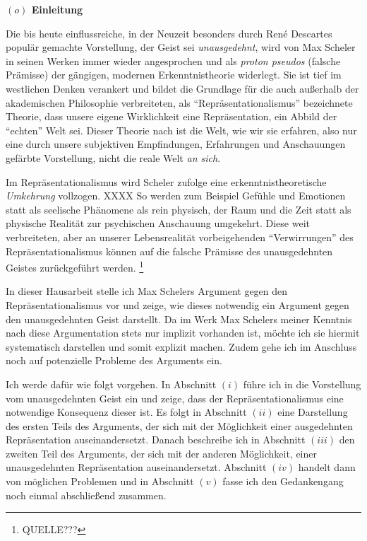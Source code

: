 \documentclass[a4paper, 12pt]{article}
\begin{document}
\begin{onehalfspace} 

\noindent\textbf{$(o)$ Einleitung}

\noindent Die bis heute einflussreiche, in der Neuzeit besonders durch Ren\'e Descartes populär gemachte Vorstellung, der Geist sei \emph{unausgedehnt}, wird von Max Scheler in seinen Werken immer wieder angesprochen und als \emph{proton pseudos} (falsche Prämisse) der gängigen, modernen Erkenntnistheorie widerlegt. Sie ist tief im westlichen Denken verankert und bildet die Grundlage für die auch außerhalb der akademischen Philosophie verbreiteten, als "`Repräsentationalismus"' bezeichnete Theorie, dass unsere eigene Wirklichkeit eine Repräsentation, ein Abbild der "`echten"' Welt sei. Dieser Theorie nach ist die Welt, wie wir sie erfahren, also nur eine durch unsere subjektiven Empfindungen, Erfahrungen und Anschauungen gefärbte Vorstellung, nicht die reale Welt \emph{an sich}.

Im Repräsentationalismus wird Scheler zufolge eine erkenntnistheoretische \emph{Umkehrung} vollzogen. XXXX So werden zum Beispiel Gefühle und Emotionen statt als seelische Phänomene als rein physisch, der Raum und die Zeit statt als physische Realität zur psychischen Anschauung umgekehrt. Diese weit verbreiteten, aber an unserer Lebensrealität vorbeigehenden "`Verwirrungen"' des Repräsentationalismus können auf die falsche Prämisse des unausgedehnten Geistes zurück\-geführt werden. \footnote{QUELLE???}

In dieser Hausarbeit stelle ich Max Schelers Argument gegen den Repräsentationalismus vor und zeige, wie dieses notwendig ein Argument gegen den unausgedehnten Geist darstellt. Da im Werk Max Schelers meiner Kenntnis nach diese Argumentation stets nur implizit vorhanden ist, möchte ich sie hiermit systematisch darstellen und somit explizit machen. Zudem gehe ich im Anschluss noch auf potenzielle Probleme des Arguments ein. 

\vspace{3mm}

Ich werde dafür wie folgt vorgehen. In Abschnitt $(i)$ führe ich in die Vorstellung vom unausgedehnten Geist ein und zeige, dass der Repräsentationalismus eine notwendige Konsequenz dieser ist. Es folgt in Abschnitt $(ii)$ eine Darstellung des ersten Teils des Arguments, der sich mit der Möglichkeit einer ausgedehnten Repräsentation auseinandersetzt. Danach beschreibe ich in Abschnitt $(iii)$ den zweiten Teil des Arguments, der sich mit der anderen Möglichkeit, einer unausgedehnten Repräsentation auseinandersetzt. Abschnitt $(iv)$ handelt dann von möglichen Problemen und in Abschnitt $(v)$ fasse ich den Gedankengang noch einmal abschließend zusammen.


\end{onehalfspace}
\end{document}
